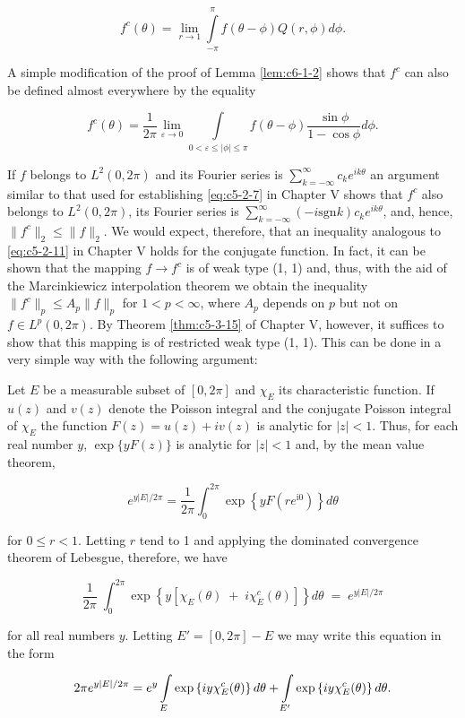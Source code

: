 \[
f^{c}(\theta)=\lim_{r\to1}\int\limits_{-\pi}^{\pi}f(\theta-\phi)Q(r,\phi)d\phi.
\]

A simple modification of the proof of Lemma \ref{lem:c6-1-2} shows that $f^{c}$ can also be defined almost everywhere by the equality

\[
f^{c}(\theta)=\frac{1}{2\pi}\lim_{\varepsilon\to0}\int\limits_{0<\varepsilon\leq|\phi|\leq\pi}f(\theta-\phi)\frac{\sin\phi}{1-\cos\phi}d\phi.
\]

If $f$ belongs to $L^2(0, 2\pi)$ and its Fourier series is $\sum_{k=-\infty}^{\infty} c_k e^{ik\theta}$ an argument similar to that used for establishing \eqref{eq:c5-2-7} in Chapter V shows that $f^c$ also belongs to $L^2(0, 2\pi)$, its Fourier series is $\sum_{k=-\infty}^{\infty} (-i \text{sgn} k) c_k e^{ik\theta}$, and, hence, $\|f^c\|_2 \leq \|f\|_2$. We would expect, therefore, that an inequality analogous to \eqref{eq:c5-2-11} in Chapter V holds for the conjugate function. In fact, it can be shown that the mapping $f \to f^c$ is of weak type (1, 1) and, thus, with the aid of the Marcinkiewicz interpolation theorem we obtain the inequality $\|f^c\|_p \leq A_p \|f\|_p$ for $1 < p < \infty$, where $A_p$ depends on $p$ but not on $f \in L^p(0, 2\pi)$. By Theorem \ref{thm:c5-3-15} of Chapter V, however, it suffices to show that this mapping is of restricted weak type (1, 1). This can be done in a very simple way with the following argument:

Let $E$ be a measurable subset of $[0, 2\pi]$ and $\chi_E$ its characteristic function. If $u(z)$ and $v(z)$ denote the Poisson integral and the conjugate Poisson integral of $\chi_E$ the function $F(z) = u(z) + iv(z)$ is analytic for $|z| < 1$. Thus, for each real number $y$, $\exp \{yF(z)\}$ is analytic for $|z| < 1$ and, by the mean value theorem,

\[
e^{y|E|/2\pi}=\frac{1}{2\pi}\int_{0}^{2\pi}\exp\left\{y F(r e^{\mathrm{i}0})\right\}d\theta
\]

for $0 \leq r < 1$. Letting $r$ tend to 1 and applying the dominated convergence theorem of Lebesgue, therefore, we have

\[
\frac{1}{2\pi}\;\int_{0}^{2\pi}\exp\left\{y[\chi_{E}(\theta)\;+\;i\chi_{E}^{c}(\theta)]\right\}d\theta\;=\;e^{y|E|/2\pi}
\]

for all real numbers $y$. Letting $E' = [0, 2\pi] - E$ we may write this equation in the form

\[
2\pi e^{y|E|/2\pi}= e^{y}\intop_{E}\exp\left\{i y\chi_{E}^{c}(\theta)\right\}d\theta + \intop_{E^{\prime}}\exp\left\{i y\chi_{E}^{c}(\theta)\right\}d\theta.
\]

